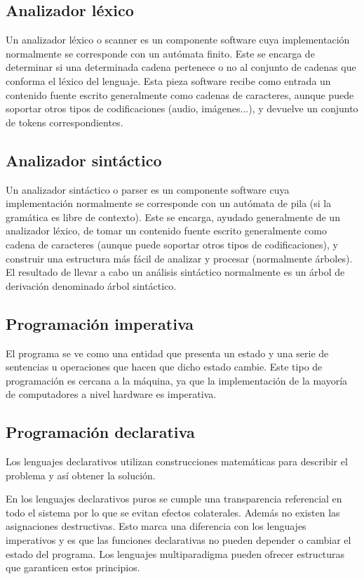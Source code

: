 \subsection {Analizador léxico}
Un analizador léxico o scanner es un componente software cuya implementación normalmente se corresponde con un autómata finito. Este se encarga de determinar si una determinada cadena pertenece o no al conjunto de cadenas 
que conforma el léxico del lenguaje. Esta pieza software recibe como entrada un contenido fuente escrito generalmente como cadenas de caracteres, aunque puede soportar otros tipos de codificaciones
(audio, imágenes...), y devuelve un conjunto de tokens correspondientes. 

\subsection {Analizador sintáctico}
Un analizador sintáctico o parser es un componente software cuya implementación normalmente se corresponde con un autómata de pila (si la gramática es libre de contexto). Este se encarga, ayudado generalmente de un analizador léxico,
de tomar un contenido fuente escrito generalmente como cadena de caracteres (aunque puede soportar otros tipos de codificaciones), y construir una estructura más fácil de analizar y procesar 
(normalmente árboles). El resultado de llevar a cabo un análisis sintáctico normalmente es un árbol de derivación denominado árbol sintáctico. 


\subsection {Programación imperativa}
El programa se ve como una entidad que presenta un estado y una serie de sentencias u operaciones que hacen que dicho estado cambie. Este tipo de programación es cercana a la 
máquina, ya que la implementación de la mayoría de computadores a nivel hardware es imperativa. 

\subsection {Programación declarativa}
Los lenguajes declarativos utilizan construcciones matemáticas para describir el problema y así obtener la solución.  

En los lenguajes declarativos puros se cumple una transparencia referencial en todo el sistema por lo
que se evitan efectos colaterales. Además no existen las asignaciones destructivas. Esto marca una diferencia 
con los lenguajes imperativos y es que las funciones declarativas no pueden depender o cambiar el estado del 
programa. Los lenguajes multiparadigma pueden ofrecer estructuras que garanticen estos principios.

